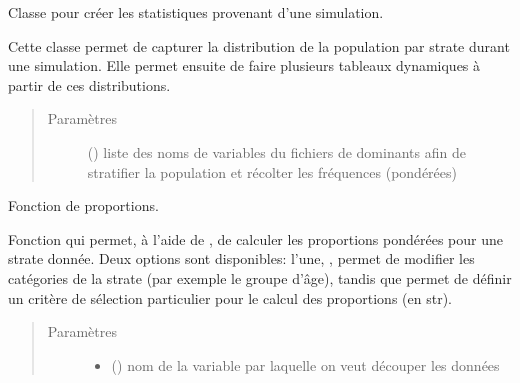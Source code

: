 \documentclass[letterpaper,10pt,french]{sphinxmanual}
\begin{document}
\begin{fulllineitems}
\label{\detokenize{utilisation:id4}}
Classe pour créer les statistiques provenant d’une simulation.

Cette classe permet de capturer la distribution de la population par strate durant une simulation. Elle permet ensuite de faire plusieurs tableaux dynamiques à partir de ces distributions.
\begin{quote}\begin{description}
\item[{Paramètres}] \leavevmode
{} () \textendash{} liste des noms de variables du fichiers de dominants afin de stratifier la population et récolter les fréquences (pondérées)

\end{description}\end{quote}

\begin{fulllineitems}
\label{\detokenize{utilisation:simgen.statistics.prop}}
Fonction de proportions.

Fonction qui permet, à l’aide de , de calculer les proportions pondérées pour une strate donnée. Deux options sont disponibles: l’une, , permet de modifier les catégories de la strate (par exemple le groupe d’âge), tandis que  permet de définir un critère de sélection particulier pour le calcul des proportions (en str).
\begin{quote}\begin{description}
\item[{Paramètres}] \leavevmode\begin{itemize}
\item {} 
 () \textendash{} nom de la variable par laquelle on veut découper les données


\end{itemize}
\end{description}
\end{quote}
\end{fulllineitems}
\end{fulllineitems}
\end{document}
